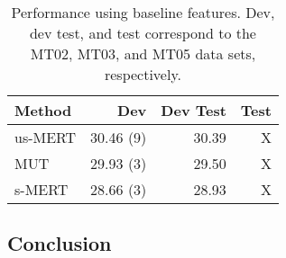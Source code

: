 \documentclass[11pt]{article}
\begin{document}
%
%
%
%
%
%
% 
%
 
\begin{table}
\begin{center}
\begin{tabular}{|l|rrr|}
\hline \bf Method  & \bf Dev & \bf Dev Test & \bf Test \\ \hline
us-MERT     & 30.46 (9)   & 30.39 & X \\
MUT  & 29.93 (3)   & 29.50 & X \\
s-MERT & 28.66 (3)  & 28.93 & X \\
\hline
\end{tabular}
\end{center}

\caption{\label{base-line} Performance using baseline features. Dev, dev test, and test correspond to the MT02, MT03, and MT05 data sets, respectively.}
\end{table}


\subsection{Conclusion}



\end{document}
